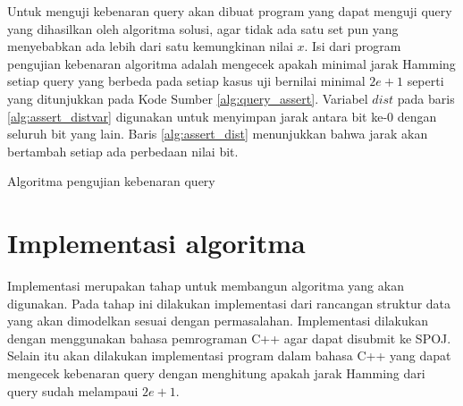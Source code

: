 Untuk menguji kebenaran query akan dibuat program yang dapat menguji query yang dihasilkan oleh algoritma solusi, agar tidak ada satu set pun yang menyebabkan ada lebih dari satu kemungkinan nilai $x$. Isi dari program pengujian kebenaran algoritma adalah mengecek apakah minimal jarak Hamming setiap query yang berbeda pada setiap kasus uji bernilai minimal $2e+1$ seperti yang ditunjukkan pada Kode Sumber \ref{alg:query_assert}. Variabel $dist$ pada baris \ref{alg:assert_distvar} digunakan untuk menyimpan jarak antara bit ke-0 dengan seluruh bit yang lain. Baris \ref{alg:assert_dist} menunjukkan bahwa jarak akan bertambah setiap ada perbedaan nilai bit.

\begin{algorithm}[h]
\caption{Algoritma pengujian kebenaran query}
\label{alg:query_assert}
\end{algorithm}


\section{Implementasi algoritma}

Implementasi merupakan tahap untuk membangun algoritma yang akan digunakan. Pada tahap ini dilakukan implementasi dari rancangan struktur data yang akan dimodelkan sesuai dengan permasalahan. Implementasi dilakukan dengan menggunakan bahasa pemrograman C++ agar dapat disubmit ke SPOJ. Selain itu akan dilakukan implementasi program dalam bahasa C++ yang dapat mengecek kebenaran query dengan menghitung apakah jarak Hamming dari query sudah melampaui $2e+1$.

